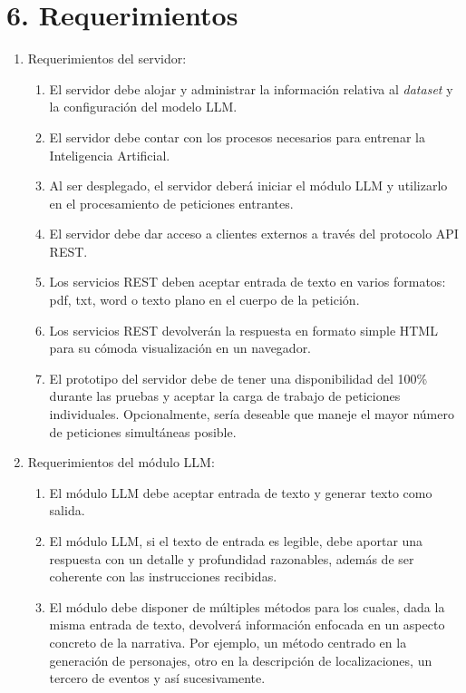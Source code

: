 \documentclass[
11pt, %
]{Clases/charter}
\begin{document}
\section{6. Requerimientos}
\label{sec:requerimientos}
\begin{enumerate}
	\item Requerimientos del servidor:
	      \begin{enumerate}
		      \item El servidor debe alojar y administrar la información relativa al \textit{dataset} y la configuración del modelo LLM.
		      \item El servidor debe contar con los procesos necesarios para entrenar la Inteligencia Artificial.
		      \item Al ser desplegado, el servidor deberá iniciar el módulo LLM y utilizarlo en el procesamiento de peticiones entrantes.
		      \item El servidor debe dar acceso a clientes externos a través del protocolo API REST.
		      \item Los servicios REST deben aceptar entrada de texto en varios formatos: pdf, txt, word o texto plano en el cuerpo de la petición.
		      \item Los servicios REST devolverán la respuesta en formato simple HTML para su cómoda visualización en un navegador.
		      \item El prototipo del servidor debe de tener una disponibilidad del 100\% durante las pruebas y aceptar la carga de trabajo de peticiones individuales.
		            Opcionalmente, sería deseable que maneje el mayor número de peticiones simultáneas posible.
	      \end{enumerate}
	\item Requerimientos del módulo LLM:
	      \begin{enumerate}
		      \item El módulo LLM debe aceptar entrada de texto y generar texto como salida.
		      \item El módulo LLM, si el texto de entrada es legible, debe aportar una respuesta con un detalle y profundidad razonables,
		            además de ser coherente con las instrucciones recibidas.
		      \item El módulo debe disponer de múltiples métodos para los cuales, dada la misma entrada de texto, devolverá información enfocada en un aspecto concreto de la narrativa.
		            Por ejemplo, un método centrado en la generación de personajes, otro en la descripción de localizaciones, un tercero de eventos y así sucesivamente.

\end{enumerate}
\end{enumerate}
\end{document}
